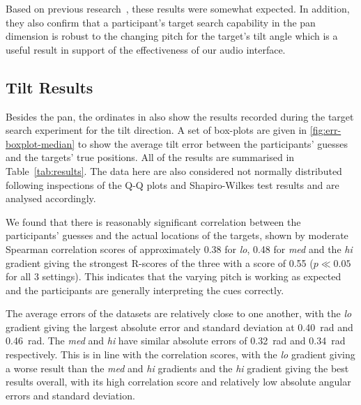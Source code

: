 \documentclass[sigconf, review=true, screen=true, anonymous=true]{acmart}
\begin{document}
Based on previous research~\cite{zwiers2001spatial}, these results were somewhat expected.
In addition, they also confirm that a participant's target search capability in the pan dimension is robust to the changing pitch for the target's tilt angle which is a useful result in support of the effectiveness of our audio interface.

\subsection{Tilt Results}\label{sec:tilt-results}

Besides the pan, the ordinates in  also show the results recorded during the target search experiment for the tilt direction.
A set of box-plots are given in \cref{fig:err-boxplot-median} to show the average tilt error between the participants' guesses and the targets' true positions.
All of the results are summarised in Table~\ref{tab:results}. 
The data here are also considered not normally distributed following inspections of the Q-Q plots and Shapiro-Wilkes test results and are analysed accordingly.

We found that there is reasonably significant correlation between the participants' guesses and the actual locations of the targets, shown by moderate Spearman correlation scores of approximately 0.38 for \emph{lo}, 0.48 for \emph{med} and the \emph{hi} gradient giving the strongest R-scores of the three with a score of 0.55 ($p \ll 0.05$ for all 3 settings).
This indicates that the varying pitch is working as expected and the participants are generally interpreting the cues correctly. 

The average errors of the datasets are relatively close to one another, with the \emph{lo} gradient giving the largest absolute error and standard deviation at \SI{0.40}{\radian} and \SI{0.46}{\radian}.
The \emph{med} and \emph{hi} have similar absolute errors of \SI{0.32}{\radian} and \SI{0.34}{\radian} respectively.
This is in line with the correlation scores, with the \emph{lo} gradient giving a worse result than the \emph{med} and \emph{hi} gradients and the \emph{hi} gradient giving the best results overall, with its high correlation score and relatively low absolute angular errors and standard deviation. 
\end{document}

